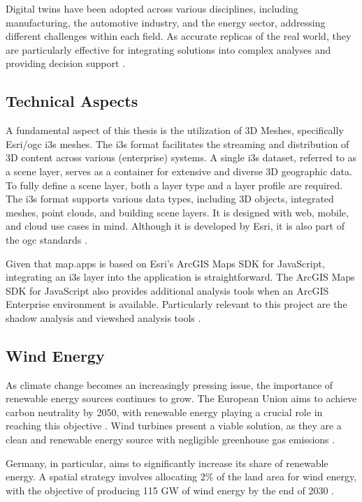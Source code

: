\documentclass[11pt, titlepage, a4paper]{scrartcl}
\begin{document}
\begin{linenumbers}
Digital twins have been adopted across various disciplines, including manufacturing, the automotive industry, and the energy sector, addressing different challenges within each field. As accurate replicas of the real world, they are particularly effective for integrating solutions into complex analyses and providing decision support \cite{pylianidisIntroducingDigitalTwins2021}.

\subsection{Technical Aspects}
A fundamental aspect of this thesis is the utilization of 3D Meshes, specifically Esri/\gls{ogc} \gls{i3s} meshes. The \gls{i3s} format facilitates the streaming and distribution of 3D content across various (enterprise) systems. A single \gls{i3s} dataset, referred to as a scene layer, serves as a container for extensive and diverse 3D geographic data. To fully define a scene layer, both a layer type and a layer profile are required.
The \gls{i3s} format supports various data types, including 3D objects, integrated meshes, point clouds, and building scene layers. It is designed with web, mobile, and cloud use cases in mind. Although it is developed by Esri, it is also part of the \gls{ogc} standards \cite{esriincI3sspec}.

Given that map.apps is based on Esri's ArcGIS Maps SDK for JavaScript, integrating an \gls{i3s} layer into the application is straightforward. The ArcGIS Maps SDK for JavaScript also provides additional analysis tools when an ArcGIS Enterprise environment is available. Particularly relevant to this project are the shadow analysis \cite{esriincShadowCast} and viewshed analysis tools \cite{esriincGeoprocessingViewshedAnalysis}.

\subsection{Wind Energy}
As climate change becomes an increasingly pressing issue, the importance of renewable energy sources continues to grow. The European Union aims to achieve carbon neutrality by 2050, with renewable energy playing a crucial role in reaching this objective \cite{europeancommission.directorategeneralforclimateaction.GoingClimateneutral20502019}. Wind turbines present a viable solution, as they are a clean and renewable energy source with negligible greenhouse gas emissions \cite{pryorClimateChangeImpacts2020}.

Germany, in particular, aims to significantly increase its share of renewable energy. A spatial strategy involves allocating 2\% of the land area for wind energy, with the objective of producing 115 GW of wind energy by the end of 2030 \cite{WindenergieLand}.


\end{linenumbers}
\end{document}
